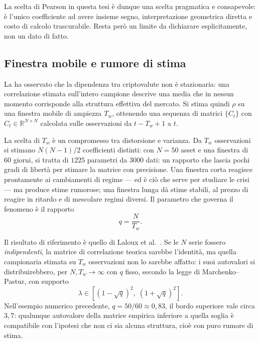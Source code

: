 La scelta di Pearson in questa tesi è dunque una scelta pragmatica e consapevole: è l'unico coefficiente ad avere insieme segno, interpretazione geometrica diretta e costo di calcolo trascurabile. Resta però un limite da dichiarare esplicitamente, non un dato di fatto.

\subsection{Finestra mobile e rumore di stima}

La  ha osservato che la dipendenza tra criptovalute non è stazionaria: una correlazione stimata sull'intero campione descrive una media che in nessun momento corrisponde alla struttura effettiva del mercato. Si stima quindi $\rho$ su una finestra mobile di ampiezza $T_w$, ottenendo una sequenza di matrici $\{C_t\}$ con $C_t\in\mathbb{R}^{N\times N}$ calcolata sulle osservazioni da $t-T_w+1$ a $t$.

La scelta di $T_w$ è un compromesso tra distorsione e varianza. Da $T_w$ osservazioni si stimano $N(N-1)/2$ coefficienti distinti: con $N=50$ asset e una finestra di $60$ giorni, si tratta di $1225$ parametri da $3000$ dati: un rapporto che lascia pochi gradi di libertà per stimare la matrice con precisione. Una finestra corta reagisce prontamente ai cambiamenti di regime — ed è ciò che serve per studiare le crisi — ma produce stime rumorose; una finestra lunga dà stime stabili, al prezzo di reagire in ritardo e di mescolare regimi diversi. Il parametro che governa il fenomeno è il rapporto
$$q = \frac{N}{T_w}.$$

Il risultato di riferimento è quello di Laloux et al.~\cite{laloux1999noise}. Se le $N$ serie fossero \emph{indipendenti}, la matrice di correlazione teorica sarebbe l'identità, ma quella campionaria stimata su $T_w$ osservazioni non lo sarebbe affatto: i suoi autovalori si distribuirebbero, per $N,T_w\to\infty$ con $q$ fisso, secondo la legge di Marchenko--Pastur, con supporto
\begin{equation}
\label{eq:marchenko-pastur}
\lambda \in \left[(1-\sqrt q)^2,\;(1+\sqrt q)^2\right].
\end{equation}
Nell'esempio numerico precedente, $q=50/60\approx0{,}83$, il bordo superiore vale circa $3{,}7$: qualunque autovalore della matrice empirica inferiore a quella soglia è compatibile con l'ipotesi che non ci sia alcuna struttura, cioè con puro rumore di stima.


